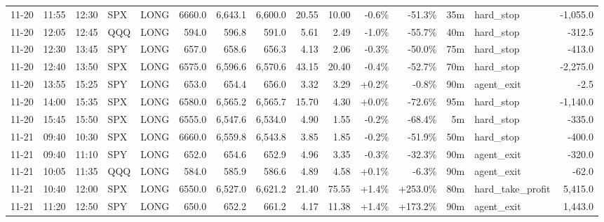 \documentclass[11pt,a4paper,twoside]{article}
\begin{document}
\begin{landscape}
\begin{center}
\begin{longtable}{>{\color{txtmain}}l l l l l r r r r r r r r >{\color{txtmain}}l r}
11-20 & 11:55 & 12:30 & SPX & LONG & 6660.0 & 6,643.1 & 6,600.0 & 20.55 & 10.00 & \textcolor{lossred}{-0.6\%} & \textcolor{lossred}{-51.3\%} & 35m & hard\_stop & \textcolor{lossred}{-1,055.0} \\
11-20 & 12:05 & 12:45 & QQQ & LONG & 594.0 & 596.8 & 591.0 & 5.61 & 2.49 & \textcolor{lossred}{-1.0\%} & \textcolor{lossred}{-55.7\%} & 40m & hard\_stop & \textcolor{lossred}{-312.5} \\
11-20 & 12:30 & 13:45 & SPY & LONG & 657.0 & 658.6 & 656.3 & 4.13 & 2.06 & \textcolor{lossred}{-0.3\%} & \textcolor{lossred}{-50.0\%} & 75m & hard\_stop & \textcolor{lossred}{-413.0} \\
11-20 & 12:40 & 13:50 & SPX & LONG & 6575.0 & 6,596.6 & 6,570.6 & 43.15 & 20.40 & \textcolor{lossred}{-0.4\%} & \textcolor{lossred}{-52.7\%} & 70m & hard\_stop & \textcolor{lossred}{-2,275.0} \\
11-20 & 13:55 & 15:25 & SPY & LONG & 653.0 & 654.4 & 656.0 & 3.32 & 3.29 & \textcolor{wingreen}{+0.2\%} & \textcolor{lossred}{-0.8\%} & 90m & agent\_exit & \textcolor{lossred}{-2.5} \\
11-20 & 14:00 & 15:35 & SPX & LONG & 6580.0 & 6,565.2 & 6,565.7 & 15.70 & 4.30 & \textcolor{wingreen}{+0.0\%} & \textcolor{lossred}{-72.6\%} & 95m & hard\_stop & \textcolor{lossred}{-1,140.0} \\
11-20 & 15:45 & 15:50 & SPX & LONG & 6555.0 & 6,547.6 & 6,534.0 & 4.90 & 1.55 & \textcolor{lossred}{-0.2\%} & \textcolor{lossred}{-68.4\%} & 5m & hard\_stop & \textcolor{lossred}{-335.0} \\
11-21 & 09:40 & 10:30 & SPX & LONG & 6660.0 & 6,559.8 & 6,543.8 & 3.85 & 1.85 & \textcolor{lossred}{-0.2\%} & \textcolor{lossred}{-51.9\%} & 50m & hard\_stop & \textcolor{lossred}{-400.0} \\
11-21 & 09:40 & 11:10 & SPY & LONG & 652.0 & 654.6 & 652.9 & 4.96 & 3.35 & \textcolor{lossred}{-0.3\%} & \textcolor{lossred}{-32.3\%} & 90m & agent\_exit & \textcolor{lossred}{-320.0} \\
11-21 & 10:05 & 11:35 & QQQ & LONG & 584.0 & 585.9 & 586.6 & 4.89 & 4.58 & \textcolor{wingreen}{+0.1\%} & \textcolor{lossred}{-6.3\%} & 90m & agent\_exit & \textcolor{lossred}{-62.0} \\
11-21 & 10:40 & 12:00 & SPX & LONG & 6550.0 & 6,527.0 & 6,621.2 & 21.40 & 75.55 & \textcolor{wingreen}{+1.4\%} & \textcolor{wingreen}{+253.0\%} & 80m & hard\_take\_profit & \textcolor{wingreen}{5,415.0} \\
11-21 & 11:20 & 12:50 & SPY & LONG & 650.0 & 652.2 & 661.2 & 4.17 & 11.38 & \textcolor{wingreen}{+1.4\%} & \textcolor{wingreen}{+173.2\%} & 90m & agent\_exit & \textcolor{wingreen}{1,443.0} \\

\end{longtable}
\end{center}
\end{landscape}
\end{document}
